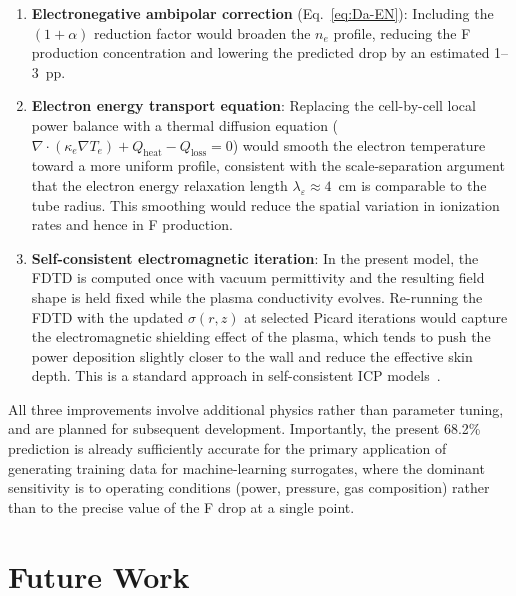 \documentclass[11pt,a4paper]{report}
\newcommand{\Te}{T_e}
\begin{document}
\begin{enumerate}
  \item \textbf{Electronegative ambipolar correction} (Eq.~\ref{eq:Da-EN}): Including the $(1+\alpha)$ reduction factor would broaden the $n_e$ profile, reducing the F production concentration and lowering the predicted drop by an estimated 1--3~pp.

  \item \textbf{Electron energy transport equation}: Replacing the cell-by-cell local power balance with a thermal diffusion equation ($\nabla\cdot(\kappa_e\nabla\Te) + Q_\mathrm{heat} - Q_\mathrm{loss} = 0$) would smooth the electron temperature toward a more uniform profile, consistent with the scale-separation argument that the electron energy relaxation length $\lambda_\varepsilon \approx 4$~cm is comparable to the tube radius.  This smoothing would reduce the spatial variation in ionization rates and hence in F production.

  \item \textbf{Self-consistent electromagnetic iteration}: In the present model, the FDTD is computed once with vacuum permittivity and the resulting field shape is held fixed while the plasma conductivity evolves.  Re-running the FDTD with the updated $\sigma(r,z)$ at selected Picard iterations would capture the electromagnetic shielding effect of the plasma, which tends to push the power deposition slightly closer to the wall and reduce the effective skin depth.  This is a standard approach in self-consistent ICP models~\cite{Kushner2009}.
\end{enumerate}

All three improvements involve additional physics rather than parameter tuning, and are planned for subsequent development.  Importantly, the present 68.2\% prediction is already sufficiently accurate for the primary application of generating training data for machine-learning surrogates, where the dominant sensitivity is to operating conditions (power, pressure, gas composition) rather than to the precise value of the F drop at a single point.


\newpage
\chapter{Future Work}
\label{ch:future}


\end{document}

